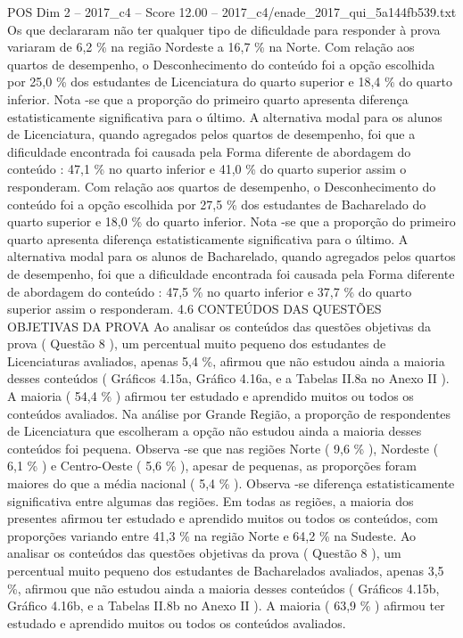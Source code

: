 \begin{textsample}{POS Dim 2 – 2017\_c4 – Score 12.00 – 2017\_c4/enade\_2017\_qui\_5a144fb539.txt}
Os que declararam não ter qualquer tipo de dificuldade para responder à prova variaram de 6,2 \% na região Nordeste a 16,7 \% na Norte.
Com relação aos quartos de desempenho, o Desconhecimento do conteúdo foi a opção escolhida por 25,0 \% dos estudantes de Licenciatura do quarto superior e 18,4 \% do quarto inferior.
Nota -se que a proporção do primeiro quarto apresenta diferença estatisticamente significativa para o último.
A alternativa modal para os alunos de Licenciatura, quando agregados pelos quartos de desempenho, foi que a dificuldade encontrada foi causada pela Forma diferente de abordagem do conteúdo : 47,1 \% no quarto inferior e 41,0 \% do quarto superior assim o responderam.
Com relação aos quartos de desempenho, o Desconhecimento do conteúdo foi a opção escolhida por 27,5 \% dos estudantes de Bacharelado do quarto superior e 18,0 \% do quarto inferior.
Nota -se que a proporção do primeiro quarto apresenta diferença estatisticamente significativa para o último.
A alternativa modal para os alunos de Bacharelado, quando agregados pelos quartos de desempenho, foi que a dificuldade encontrada foi causada pela Forma diferente de abordagem do conteúdo : 47,5 \% no quarto inferior e 37,7 \% do quarto superior assim o responderam. 4.6 CONTEÚDOS DAS QUESTÕES OBJETIVAS DA PROVA Ao analisar os conteúdos das questões objetivas da prova ( Questão 8 ), um percentual muito pequeno dos estudantes de Licenciaturas avaliados, apenas 5,4 \%, afirmou que não estudou ainda a maioria desses conteúdos ( Gráficos 4.15a, Gráfico 4.16a, e a Tabelas II.8a no Anexo II ).
A maioria ( 54,4 \% ) afirmou ter estudado e aprendido muitos ou todos os conteúdos avaliados.
Na análise por Grande Região, a proporção de respondentes de Licenciatura que escolheram a opção não estudou ainda a maioria desses conteúdos foi pequena.
Observa -se que nas regiões Norte ( 9,6 \% ), Nordeste ( 6,1 \% ) e Centro-Oeste ( 5,6 \% ), apesar de pequenas, as proporções foram maiores do que a média nacional ( 5,4 \% ).
Observa -se diferença estatisticamente significativa entre algumas das regiões.
Em todas as regiões, a maioria dos presentes afirmou ter estudado e aprendido muitos ou todos os conteúdos, com proporções variando entre 41,3 \% na região Norte e 64,2 \% na Sudeste.
Ao analisar os conteúdos das questões objetivas da prova ( Questão 8 ), um percentual muito pequeno dos estudantes de Bacharelados avaliados, apenas 3,5 \%, afirmou que não estudou ainda a maioria desses conteúdos ( Gráficos 4.15b, Gráfico 4.16b, e a Tabelas II.8b no Anexo II ).
A maioria ( 63,9 \% ) afirmou ter estudado e aprendido muitos ou todos os conteúdos avaliados.

\end{textsample}
